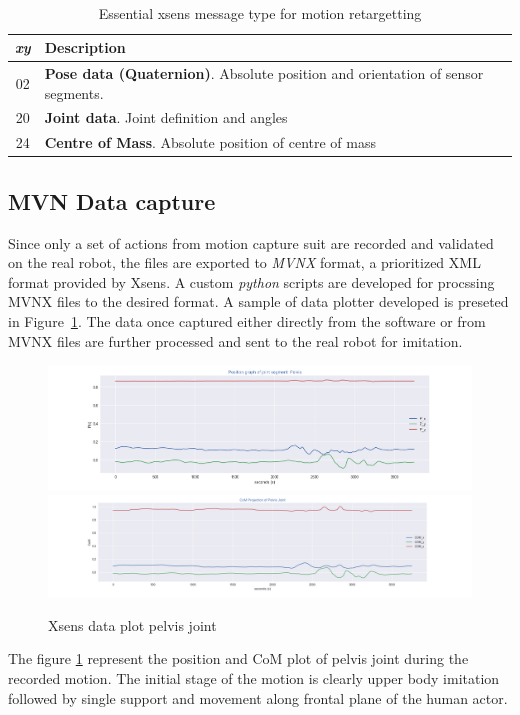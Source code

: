 ~

\begin{table}[h!]
    \label{tab: xsens-message}
    \begin{tabular}{|c|l|}
        \hline
        \textbf{\textit{xy}} & \textbf{Description} \\
        \hline
        02 & \textbf{Pose data (Quaternion)}. Absolute position and orientation of sensor segments. \\
        \hline 
        20 & \textbf{Joint data}. Joint definition and angles \\
        \hline
        24 & \textbf{Centre of Mass}. Absolute position of centre of mass \\
        \hline
    \end{tabular}
    \caption{Essential xsens message type for motion retargetting}
\end{table}

\subsection{MVN Data capture}

Since only a set of actions from motion capture suit are recorded and validated on the real robot, the files are exported to \textit{MVNX} format, a prioritized XML format provided by Xsens. A custom \textit{python} scripts are developed 
for procssing MVNX files to the desired format. A sample of data plotter developed is preseted in Figure~\ref{fig: xsens-plot}. The data once captured either
directly from the software or from MVNX files are further processed and sent to the real robot for imitation.  


\begin{figure}[h!]
    \centering
    \includegraphics[scale=0.435]{images/xsens-pelvis-position.png}\hfill
    \includegraphics[scale=0.35]{images/xsens-pelvis-com.png}\hfill
    \caption{Xsens data plot pelvis joint}\hfill
    \label{fig: xsens-plot}
\end{figure}

The figure \ref{fig: xsens-plot} represent the position and CoM plot of pelvis joint during the recorded motion. 
The initial stage of the motion is clearly upper body imitation followed by single support and movement along frontal plane of the human actor.